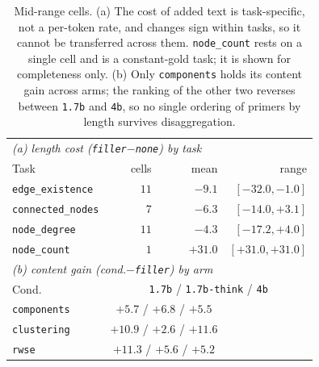 \begin{table}[t]\centering\small
\begin{tabular}{lrrr}
\toprule
\multicolumn{4}{l}{\emph{(a) length cost (\texttt{filler}$-$\texttt{none}) by task}} \\
Task & cells & mean & range \\
\midrule
\texttt{edge\_existence} & $11$ & $-9.1$ & $[-32.0, -1.0]$ \\
\texttt{connected\_nodes} & $7$ & $-6.3$ & $[-14.0, +3.1]$ \\
\texttt{node\_degree} & $11$ & $-4.3$ & $[-17.2, +4.0]$ \\
\texttt{node\_count} & $1$ & $+31.0$ & $[+31.0, +31.0]$ \\
\midrule
\multicolumn{4}{l}{\emph{(b) content gain (cond.$-$\texttt{filler}) by arm}} \\
Cond. & \multicolumn{3}{c}{\texttt{1.7b} / \texttt{1.7b-think} / \texttt{4b}} \\
\midrule
\texttt{components} & \multicolumn{2}{c}{$+5.7$ / $+6.8$ / $+5.5$} \\
\texttt{clustering} & \multicolumn{2}{c}{$+10.9$ / $+2.6$ / $+11.6$} \\
\texttt{rwse} & \multicolumn{2}{c}{$+11.3$ / $+5.6$ / $+5.2$} \\
\bottomrule
\end{tabular}
\caption{Mid-range cells. (a) The cost of added text is task-specific, not a per-token rate, and changes sign within tasks, so it cannot be transferred across them. \texttt{node\_count} rests on a single cell and is a constant-gold task; it is shown for completeness only. (b) Only \texttt{components} holds its content gain across arms; the ranking of the other two reverses between \texttt{1.7b} and \texttt{4b}, so no single ordering of primers by length survives disaggregation.}
\label{tab:lengthcost}
\end{table}
